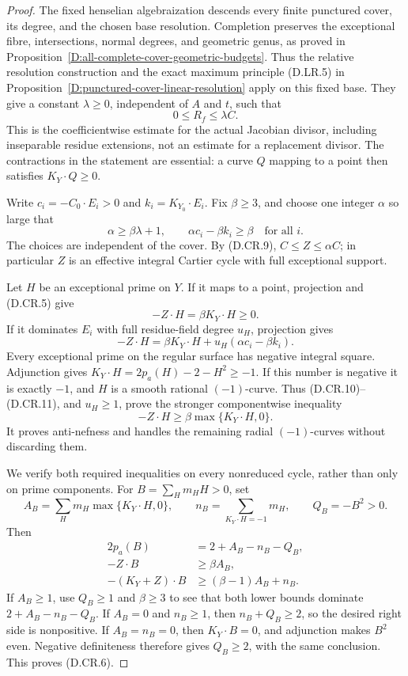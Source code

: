 \begin{proof}
The fixed henselian algebraization descends every finite
punctured cover, its degree, and the chosen base resolution.
Completion preserves the exceptional fibre, intersections,
normal degrees, and geometric genus, as proved in
Proposition~\ref{D:all-complete-cover-geometric-budgets}.
Thus the relative resolution construction and the exact
maximum principle (D.LR.5) in
Proposition~\ref{D:punctured-cover-linear-resolution} apply
on this fixed base. They give a constant $\lambda\ge0$,
independent of $A$ and $t$, such that
\[
                  0\le R_f\le\lambda C.                  \tag{D.CR.9}
\]
This is the coefficientwise estimate for the actual
Jacobian divisor, including inseparable residue extensions,
not an estimate for a replacement divisor. The contractions
in the statement are essential: a curve $Q$ mapping to a
point then satisfies $K_Y\cdot Q\ge0$.

Write $c_i=-C_0\cdot E_i>0$ and $k_i=K_{Y_0}\cdot E_i$.
Fix $\beta\ge3$, and choose one integer $\alpha$ so large that
\[
        \alpha\ge\beta\lambda+1,\qquad
        \alpha c_i-\beta k_i\ge\beta\quad\text{for all }i.
                                                               \tag{D.CR.10}
\]
The choices are independent of the cover. By (D.CR.9),
$C\le Z\le\alpha C$; in particular $Z$ is an effective
integral Cartier cycle with full exceptional support.

Let $H$ be an exceptional prime on $Y$. If it maps to a
point, projection and (D.CR.5) give
\[
                   -Z\cdot H=\beta K_Y\cdot H\ge0.
\]
If it dominates $E_i$ with full residue-field degree $u_H$,
projection gives
\[
 -Z\cdot H
    =\beta K_Y\cdot H+
             u_H(\alpha c_i-\beta k_i).                 \tag{D.CR.11}
\]
Every exceptional prime on the regular surface has negative
integral square. Adjunction gives
$K_Y\cdot H=2p_a(H)-2-H^2\ge-1$.
If this number is negative it is exactly $-1$, and $H$ is
a smooth rational $(-1)$-curve. Thus (D.CR.10)--(D.CR.11),
and $u_H\ge1$, prove the stronger componentwise inequality
\[
          -Z\cdot H\ge
                  \beta\max\{K_Y\cdot H,0\}.             \tag{D.CR.12}
\]
It proves anti-nefness and handles the remaining radial
$(-1)$-curves without discarding them.

We verify both required inequalities on every nonreduced
cycle, rather than only on prime components. For
$B=\sum_H m_HH>0$, set
\[
 A_B=\sum_Hm_H\max\{K_Y\cdot H,0\},\qquad
 n_B=\sum_{K_Y\cdot H=-1}m_H,\qquad Q_B=-B^2>0 .
\]
Then
\[
 \begin{split}
 2p_a(B)&=2+A_B-n_B-Q_B,\\
 -Z\cdot B&\ge\beta A_B,\\
 -(K_Y+Z)\cdot B&\ge(\beta-1)A_B+n_B.
 \end{split}                                             \tag{D.CR.13}
\]
If $A_B\ge1$, use $Q_B\ge1$ and $\beta\ge3$ to see that
both lower bounds dominate $2+A_B-n_B-Q_B$.
If $A_B=0$ and $n_B\ge1$, then $n_B+Q_B\ge2$, so the
desired right side is nonpositive. If $A_B=n_B=0$, then
$K_Y\cdot B=0$, and adjunction makes $B^2$ even. Negative
definiteness therefore gives $Q_B\ge2$, with the same
conclusion. This proves (D.CR.6).


\end{proof}
